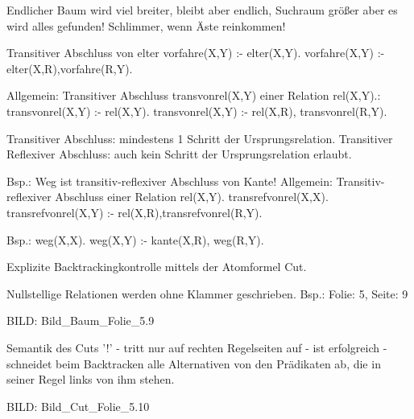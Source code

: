 Endlicher Baum wird viel breiter, bleibt aber endlich, Suchraum größer aber es wird alles gefunden!
Schlimmer, wenn \infty Äste reinkommen!



Transitiver Abschluss von elter
vorfahre(X,Y) :- elter(X,Y).
vorfahre(X,Y) :- elter(X,R),vorfahre(R,Y).

Allgemein: Transitiver Abschluss transvonrel(X,Y) einer Relation rel(X,Y).:
transvonrel(X,Y) :- rel(X,Y).
transvonrel(X,Y) :- rel(X,R), transvonrel(R,Y).

Transitiver Abschluss: mindestens 1 Schritt der Ursprungsrelation.
Transitiver Reflexiver Abschluss: auch kein Schritt der Ursprungsrelation erlaubt.

Bsp.: Weg ist transitiv-reflexiver Abschluss von Kante!
Allgemein: Transitiv-reflexiver Abschluss einer Relation rel(X,Y).
transrefvonrel(X,X).
transrefvonrel(X,Y) :- rel(X,R),transrefvonrel(R,Y).

Bsp.:
weg(X,X).
weg(X,Y) :- kante(X,R), weg(R,Y).


Explizite Backtrackingkontrolle mittels der Atomformel Cut.

Nullstellige Relationen werden ohne Klammer geschrieben.
Bsp.: Folie: 5, Seite: 9



BILD: Bild_Baum_Folie_5.9



Semantik des Cuts '!'
- tritt nur auf rechten Regelseiten auf
- ist erfolgreich
- schneidet beim Backtracken alle Alternativen von den Prädikaten ab, die in seiner Regel links von ihm stehen.



BILD: Bild_Cut_Folie_5.10